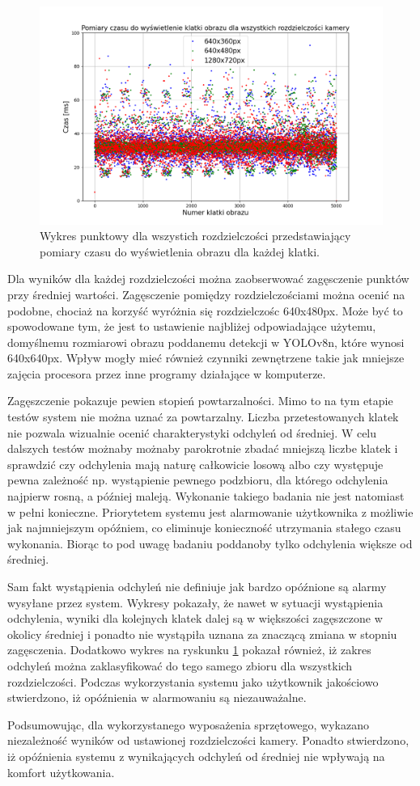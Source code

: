 \begin{figure}[H]
    \centering
    \includegraphics[width=\linewidth]{r_test_szybkosci/punkty/all.png}
    \caption{Wykres punktowy dla wszystich rozdzielczości przedstawiający pomiary czasu do wyświetlenia obrazu dla każdej klatki.}
    \label{fig:czas-punktowy-all}    
\end{figure}

Dla wyników dla każdej rozdzielczości można zaobserwować zagęsczenie punktów przy średniej wartości. 
Zagęsczenie pomiędzy rozdzielczościami można ocenić na podobne, chociaż na korzyść wyróżnia się rozdzielczośc 640x480px. Może być to spowodowane tym, że jest to ustawienie najbliżej odpowiadające użytemu, domyślnemu rozmiarowi obrazu poddanemu detekcji w YOLOv8n, które wynosi 640x640px. Wpływ mogły mieć również czynniki zewnętrzene takie jak mniejsze zajęcia procesora przez inne programy działające w komputerze.  

Zagęszczenie pokazuje pewien stopień powtarzalności. Mimo to na tym etapie testów system nie można uznać za powtarzalny. Liczba przetestowanych klatek nie pozwala wizualnie ocenić charakterystyki odchyleń od średniej. W celu dalszych testów możnaby możnaby parokrotnie zbadać mniejszą liczbe klatek i sprawdzić czy odchylenia mają naturę całkowicie losową albo czy występuje pewna zależność np. wystąpienie pewnego podzbioru, dla którego odchylenia najpierw rosną, a później maleją. Wykonanie takiego badania nie jest natomiast w pełni konieczne. Priorytetem systemu jest alarmowanie użytkownika z możliwie jak najmniejszym opóźniem, co eliminuje konieczność utrzymania stałego czasu wykonania. Biorąc to pod uwagę badaniu poddanoby tylko odchylenia większe od średniej. 

Sam fakt wystąpienia odchyleń nie definiuje jak bardzo opóźnione są alarmy wysyłane przez system. Wykresy pokazały, że nawet w sytuacji wystąpienia odchylenia, wyniki dla kolejnych klatek dalej są w większości zagęszczone w okolicy średniej i ponadto nie wystąpiła uznana za znaczącą zmiana w stopniu zagęsczenia. Dodatkowo wykres na ryskunku \ref{fig:czas-punktowy-all} pokazał również, iż zakres odchyleń można zaklasyfikować do tego samego zbioru dla wszystkich rozdzielczości.   
Podczas wykorzystania systemu jako użytkownik jakościowo stwierdzono, iż opóźnienia w alarmowaniu są niezauważalne. 

Podsumowując, dla wykorzystanego wyposażenia sprzętowego, wykazano niezależność wyników od ustawionej rozdzielczości kamery. Ponadto stwierdzono, iż opóźnienia systemu z wynikających odchyleń od średniej nie wpływają na komfort użytkowania.

